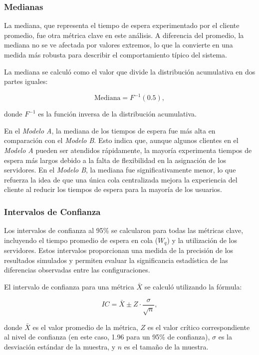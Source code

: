 \documentclass[a4paper,12pt]{article}
\begin{document}
\subsubsection{Medianas}

La mediana, que representa el tiempo de espera experimentado por el cliente promedio, fue otra métrica clave en este análisis. A diferencia del promedio, la mediana no se ve afectada por valores extremos, lo que la convierte en una medida más robusta para describir el comportamiento típico del sistema.

La mediana se calculó como el valor que divide la distribución acumulativa en dos partes iguales:

\[
\text{Mediana} = F^{-1}(0.5),
\]

donde \( F^{-1} \) es la función inversa de la distribución acumulativa.

En el \textit{Modelo A}, la mediana de los tiempos de espera fue más alta en comparación con el \textit{Modelo B}. Esto indica que, aunque algunos clientes en el \textit{Modelo A} pueden ser atendidos rápidamente, la mayoría experimenta tiempos de espera más largos debido a la falta de flexibilidad en la asignación de los servidores. En el \textit{Modelo B}, la mediana fue significativamente menor, lo que refuerza la idea de que una única cola centralizada mejora la experiencia del cliente al reducir los tiempos de espera para la mayoría de los usuarios.

\subsubsection{Intervalos de Confianza}

Los intervalos de confianza al 95\% se calcularon para todas las métricas clave, incluyendo el tiempo promedio de espera en cola (\( W_q \)) y la utilización de los servidores. Estos intervalos proporcionan una medida de la precisión de los resultados simulados y permiten evaluar la significancia estadística de las diferencias observadas entre las configuraciones.

El intervalo de confianza para una métrica \( \bar{X} \) se calculó utilizando la fórmula:

\[
IC = \bar{X} \pm Z \cdot \frac{\sigma}{\sqrt{n}},
\]

donde \( \bar{X} \) es el valor promedio de la métrica, \( Z \) es el valor crítico correspondiente al nivel de confianza (en este caso, 1.96 para un 95\% de confianza), \( \sigma \) es la desviación estándar de la muestra, y \( n \) es el tamaño de la muestra.
\end{document}
